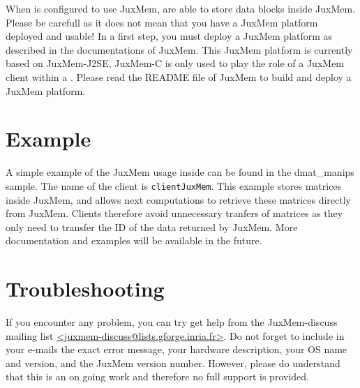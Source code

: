 When \diet is configured to use JuxMem, \sed are able to store data
blocks inside JuxMem. Please be carefull as it does not mean that you
have a JuxMem platform deployed and usable!  In a first step, you must
deploy a JuxMem platform as described in the documentations of
JuxMem. This JuxMem platform is currently based on JuxMem-J2SE,
JuxMem-C is only used to play the role of a JuxMem client within a
\diet \sed. Please read the README file of JuxMem to build and deploy
a JuxMem platform.

\section{Example}

A simple example of the JuxMem usage inside \diet can be found in the
dmat\_manips sample. The name of the client is
\texttt{clientJuxMem}. This example stores \diet matrices inside JuxMem, 
and allows next computations to retrieve these matrices directly from
JuxMem. Clients therefore avoid unnecessary tranfers of matrices as
they only need to transfer the ID of the data returned by JuxMem. More
documentation and examples will be available in the future.

\section{Troubleshooting}

If you encounter any problem, you can try get help from the
JuxMem-discuss mailing list
\url{<juxmem-discuss@lists.gforge.inria.fr>}. Do not forget to include
in your e-mails the exact error message, your hardware description,
your OS name and version, and the JuxMem version number.  However,
please do understand that this is an on going work and therefore no
full support is provided.